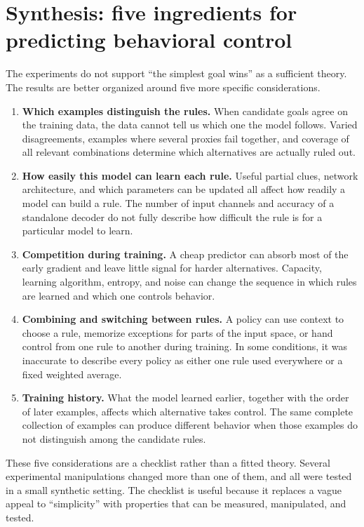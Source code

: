\documentclass[11pt,a4paper]{article}
\begin{document}
\section*{Synthesis: five ingredients for predicting behavioral control}

The experiments do not support ``the simplest goal wins'' as a sufficient theory. The results are better organized around five more specific considerations.

\begin{enumerate}[leftmargin=*,itemsep=0.45em]
  \item \textbf{Which examples distinguish the rules.} When candidate goals agree on the training data, the data cannot tell us which one the model follows. Varied disagreements, examples where several proxies fail together, and coverage of all relevant combinations determine which alternatives are actually ruled out.
  \item \textbf{How easily this model can learn each rule.} Useful partial clues, network architecture, and which parameters can be updated all affect how readily a model can build a rule. The number of input channels and accuracy of a standalone decoder do not fully describe how difficult the rule is for a particular model to learn.
  \item \textbf{Competition during training.} A cheap predictor can absorb most of the early gradient and leave little signal for harder alternatives. Capacity, learning algorithm, entropy, and noise can change the sequence in which rules are learned and which one controls behavior.
  \item \textbf{Combining and switching between rules.} A policy can use context to choose a rule, memorize exceptions for parts of the input space, or hand control from one rule to another during training. In some conditions, it was inaccurate to describe every policy as either one rule used everywhere or a fixed weighted average.
  \item \textbf{Training history.} What the model learned earlier, together with the order of later examples, affects which alternative takes control. The same complete collection of examples can produce different behavior when those examples do not distinguish among the candidate rules.
\end{enumerate}

These five considerations are a checklist rather than a fitted theory. Several experimental manipulations changed more than one of them, and all were tested in a small synthetic setting. The checklist is useful because it replaces a vague appeal to ``simplicity'' with properties that can be measured, manipulated, and tested.
\end{document}
